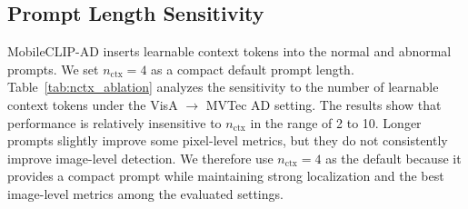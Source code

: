 \documentclass[10pt]{article}
\begin{document}
\subsection{Prompt Length Sensitivity}

MobileCLIP-AD inserts learnable context tokens into the normal and abnormal prompts. We set $n_{\mathrm{ctx}}=4$ as a compact default prompt length. Table~\ref{tab:nctx_ablation} analyzes the sensitivity to the number of learnable context tokens under the VisA $\rightarrow$ MVTec AD setting. The results show that performance is relatively insensitive to $n_{\mathrm{ctx}}$ in the range of 2 to 10. Longer prompts slightly improve some pixel-level metrics, but they do not consistently improve image-level detection. We therefore use $n_{\mathrm{ctx}}=4$ as the default because it provides a compact prompt while maintaining strong localization and the best image-level metrics among the evaluated settings.

\begin{table}[htbp]
\centering
\caption{Sensitivity analysis on the number of learnable context tokens under the VisA $\rightarrow$ MVTec AD setting. Metrics are reported in percentage as mean $\pm$ standard deviation over three seeds. Image-level metrics are computed using score-mean aggregation.}
\label{tab:nctx_ablation}
\renewcommand{\arraystretch}{1.08}
\scriptsize
{}
\end{table}
\end{document}
